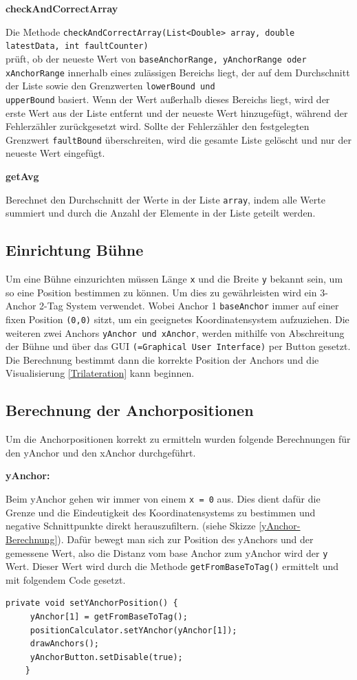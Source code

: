 \textbf{checkAndCorrectArray}

Die Methode \texttt{checkAndCorrectArray(List<Double> array, double latestData, int faultCounter)} \\ prüft, ob der neueste Wert von \texttt{baseAnchorRange, yAnchorRange oder xAnchorRange} innerhalb eines zulässigen Bereichs liegt, der auf dem Durchschnitt der Liste sowie den Grenzwerten \texttt{lowerBound und \\ upperBound} basiert. Wenn der Wert außerhalb dieses Bereichs liegt, wird der erste Wert aus der Liste entfernt und der neueste Wert hinzugefügt, während der Fehlerzähler zurückgesetzt wird. Sollte der Fehlerzähler den festgelegten Grenzwert \texttt{faultBound} überschreiten, wird die gesamte Liste gelöscht und nur der neueste Wert eingefügt.

\textbf{getAvg}

Berechnet den Durchschnitt der Werte in der Liste \texttt{array}, indem alle Werte summiert und durch die Anzahl der Elemente in der Liste geteilt werden.

\subsection{Einrichtung Bühne}
\label{Einrichtung Bühne}
Um eine Bühne einzurichten müssen Länge \texttt{x} und die Breite \texttt{y} bekannt sein, um so eine Position bestimmen zu können. Um dies zu gewährleisten wird ein 3-Anchor 2-Tag System verwendet. Wobei Anchor 1 \texttt{baseAnchor} immer auf einer fixen Position \texttt{(0,0)} sitzt, um ein geeignetes Koordinatensystem aufzuziehen. Die weiteren zwei Anchors \texttt{yAnchor und xAnchor}, werden mithilfe von Abschreitung der Bühne und über das GUI \texttt{(=Graphical User Interface)} per Button gesetzt. Die Berechnung bestimmt dann die korrekte Position der Anchors und die Visualisierung \ref{Trilateration} kann beginnen. 
\newpage
\subsection{Berechnung der Anchorpositionen}
Um die Anchorpositionen korrekt zu ermitteln wurden folgende Berechnungen für den yAnchor und den xAnchor durchgeführt.

\textbf{yAnchor:}

Beim yAnchor gehen wir immer von einem \texttt{x = 0} aus. Dies dient dafür die Grenze und die Eindeutigkeit des Koordinatensystems zu bestimmen und negative Schnittpunkte direkt herauszufiltern. (siehe Skizze \ref{yAnchor-Berechnung}). Dafür bewegt man sich zur Position des yAnchors und der gemessene Wert, also die Distanz vom base Anchor zum yAnchor wird der \texttt{y} Wert. Dieser Wert wird durch die Methode \texttt{getFromBaseToTag()} ermittelt und mit folgendem Code gesetzt.
\begin{lstlisting}[style=Java, caption=Berechnung yAnchor, captionpos=b]
	private void setYAnchorPosition() {
     yAnchor[1] = getFromBaseToTag();
     positionCalculator.setYAnchor(yAnchor[1]);
     drawAnchors();
     yAnchorButton.setDisable(true);
    }
\end{lstlisting}


